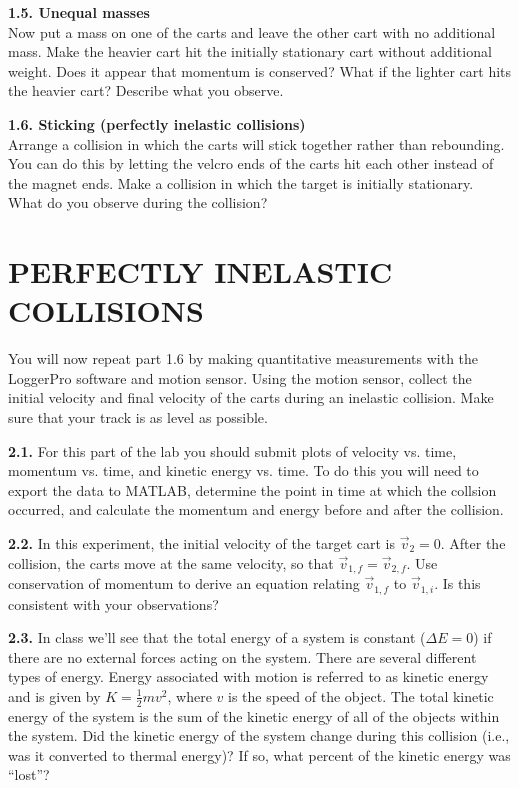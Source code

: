 \documentclass[11pt,letterpaper]{article}
\begin{document}
{\bf 1.5. Unequal masses}\\ 
Now put a mass on one of the carts and leave
the other cart with no additional mass.  Make the heavier cart hit the
initially stationary cart without additional weight. Does it appear
that momentum is conserved? What if the lighter cart hits the heavier cart? Describe what you observe.

{\bf 1.6. Sticking (perfectly inelastic collisions)}\\ 
Arrange a collision in which the carts will stick together rather than rebounding.  You can do this by letting the velcro ends of the carts hit each other instead of the
magnet ends.  Make a collision in which the target is initially stationary.  What do you observe during the collision?


\section{PERFECTLY INELASTIC COLLISIONS}
You will now repeat part 1.6 by making quantitative measurements with the LoggerPro software and motion sensor. Using the motion sensor, collect the initial velocity and final velocity of the carts during an inelastic collision. Make sure that your track is as level as possible.

\textbf{2.1.} For this part of the lab you should submit plots of velocity vs. time, momentum vs. time, and kinetic energy vs. time. To do this you will need to export the data to MATLAB, determine the point in time at which the collsion occurred, and calculate the momentum and energy before and after the collision.

\textbf{2.2.} In this experiment, the initial velocity of the target cart is $\vec v_2=0$. After the collision, the carts move at the same velocity, so that $\vec v_{1,f}=\vec v_{2,f}$. Use conservation of momentum to derive an equation relating $\vec v_{1,f}$ to $\vec v_{1,i}$. Is this consistent with your observations?

\textbf{2.3.} In class we'll see that the total energy of a system is constant ($\Delta E=0$) if there are no external forces acting on the system. There are several different types of energy. Energy associated with motion is referred to as kinetic energy and is given by $K=\frac{1}{2}mv^2$, where $v$ is the speed of the object. The total kinetic energy of the system is the sum of the kinetic energy of all of the objects within the system. Did the kinetic energy of the system change during this collision (i.e., was it converted to thermal energy)? If so, what percent of the kinetic energy was ``lost''?
\end{document}
